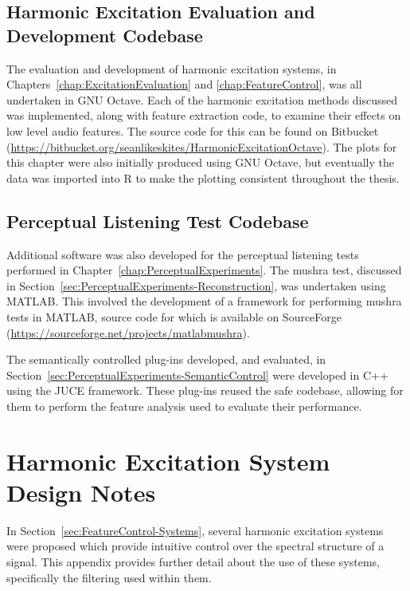 \begin{appendices}
	\section{Harmonic Excitation Evaluation and Development Codebase}
		The evaluation and development of harmonic excitation systems, in Chapters~\ref{chap:ExcitationEvaluation}
		and \ref{chap:FeatureControl}, was all undertaken in GNU Octave. Each of the harmonic excitation methods
		discussed was implemented, along with feature extraction code, to examine their effects on low level audio
		features. The source code for this can be found on Bitbucket
		(\href{https://bitbucket.org/seanlikeskites/HarmonicExcitationOctave}
		{https://bitbucket.org/seanlikeskites/HarmonicExcitationOctave}). The plots for this chapter were also
		initially produced using GNU Octave, but eventually the data was imported into R to make the plotting
		consistent throughout the thesis.

	\section{Perceptual Listening Test Codebase}
		Additional software was also developed for the perceptual listening tests performed in
		Chapter~\ref{chap:PerceptualExperiments}. The \acrshort{mushra} test, discussed in
		Section~\ref{sec:PerceptualExperiments-Reconstruction}, was undertaken using MATLAB. This involved the
		development of a framework for performing \acrshort{mushra} tests in MATLAB, source code for which is
		available on SourceForge
		(\href{https://sourceforge.net/projects/matlabmushra}{https://sourceforge.net/projects/matlabmushra}).

		The semantically controlled plug-ins developed, and evaluated, in
		Section~\ref{sec:PerceptualExperiments-SemanticControl} were developed in C++ using the JUCE framework.
		These plug-ins reused the \acrshort{safe} codebase, allowing for them to perform the feature analysis used
		to evaluate their performance.

\chapter{Harmonic Excitation System Design Notes}
\label{app:FilterNotes}
	In Section~\ref{sec:FeatureControl-Systems}, several harmonic excitation systems were proposed which provide
	intuitive control over the spectral structure of a signal. This appendix provides further detail about the use of
	these systems, specifically the filtering used within them.


\end{appendices}
